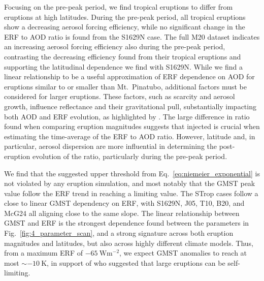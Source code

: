 \documentclass[draft]{agujournal2019}
\begin{document}
  Focusing on the pre-peak period, we find tropical eruptions to differ from eruptions
  at high latitudes. During the pre-peak period, all tropical eruptions show a
  decreasing aerosol forcing efficiency, while no significant change in the ERF to AOD
  ratio is found from the S1629N case. The full M20 dataset indicates an increasing
  aerosol forcing efficiency also during the pre-peak period, contrasting the decreasing
  efficiency found from their tropical eruptions and supporting the latitudinal
  dependence we find with S1629N. While we find a linear relationship to be a useful
  approximation of ERF dependence on AOD for eruptions similar to or smaller than Mt.\
  Pinatubo, additional factors must be considered for larger eruptions. These factors,
  such as \ce{OH} scarcity and aerosol growth, influence reflectance and their
  gravitational pull, substantially impacting both AOD and ERF evolution, as highlighted
  by \citeA{timmreck2010}. The large difference in ratio found when comparing eruption
  magnitudes suggests that injected \ce{SO2} is crucial when estimating the time-average
  of the ERF to AOD ratio. However, latitude and, in particular, aerosol dispersion are
  more influential in determining the post-eruption evolution of the ratio, particularly
  during the pre-peak period.

  We find that the suggested upper threshold from Eq.~\ref{eq:niemeier_exponential} is
  not violated by any eruption simulation, and most notably that the GMST peak value
  follow the ERF trend in reaching a limiting value. The STrop cases follow a close to
  linear GMST dependency on ERF, with S1629N, J05, T10, B20, and McG24 all aligning
  close to the same slope. The linear relationship between GMST and ERF is the strongest
  dependence found between the parameters in Fig.~\ref{fig:4_parameter_scan}, and a
  strong signature across both eruption magnitudes and latitudes, but also across highly
  different climate models. Thus, from a maximum ERF of \(\SI{-65}{\watt\metre^{-2}}\),
  we expect GMST anomalies to reach at most \(\sim\SI{-10}{\kelvin}\), in support of
  \citeA{english2013} who suggested that large eruptions can be self-limiting.
\end{document}
